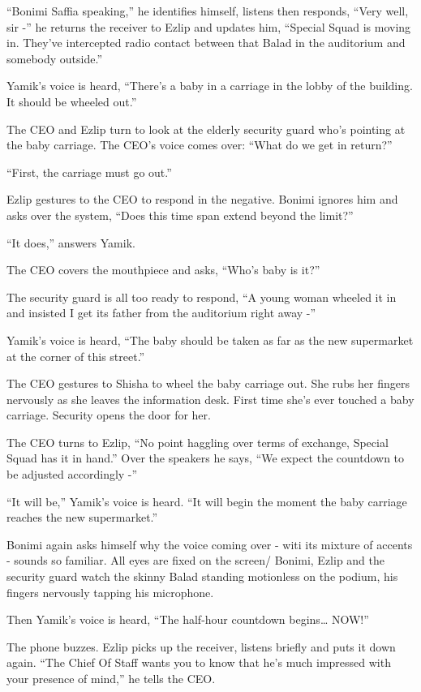 \documentclass[twoside,11pt]{book}
\begin{document}
``Bonimi Saffia speaking,'' he identifies himself, listens then responds, ``Very
well, sir -'' he returns the receiver to Ezlip and updates him, ``Special Squad is moving in.
They've intercepted radio contact between that Balad in the auditorium and somebody outside.''

Yamik's voice is heard, ``There's a baby in a carriage in the lobby of the building. It should be wheeled
out.''

The CEO and Ezlip turn to look at the elderly security{ }guard who's pointing at
the baby carriage. The CEO's voice comes over: ``What do we get in return?''

``First, the carriage must go out.''

Ezlip gestures to the CEO to respond in the negative. Bonimi ignores him and asks over the system, ``Does
this time span extend beyond the limit?''

``It does,'' answers Yamik{.}

The CEO covers the mouthpiece and asks, ``Who's baby is it?''

The security guard is all too ready to respond, ``A young{ }woman
wheeled it in and insisted I get its father from the auditorium right away -''

Yamik's voice is heard, ``The baby should be taken as far as the new supermarket at the corner of this
street.''

The CEO gestures to Shisha to wheel the baby carriage out. She rubs her fingers nervously as she leaves the information
desk. First time she's ever touched a baby carriage. Security opens the door for her.

The CEO turns to Ezlip, ``No point haggling over terms of exchange, Special Squad has it in
hand.'' Over the speakers he says, ``We expect the countdown to be adjusted accordingly
-''

``It will be,'' Yamik's voice is heard.  ``It will begin the moment the baby
carriage reaches{ }the new supermarket.''

Bonimi again asks himself why the voice coming over - witi its mixture of accents - sounds
so{ }familiar. All eyes are fixed on the
screen{/ }Bonimi, Ezlip and the security guard watch the skinny Balad standing
motionless on the podium, his fingers nervously tapping his microphone.

Then Yamik's voice is heard, ``The half-hour countdown
begins{\dots}{ }NOW!''

The phone buzzes. Ezlip picks up the receiver, listens briefly and puts it down again. ``The Chief Of Staff
wants you to know that he's much impressed with your presence of mind,'' he tells the CEO.
\end{document}
